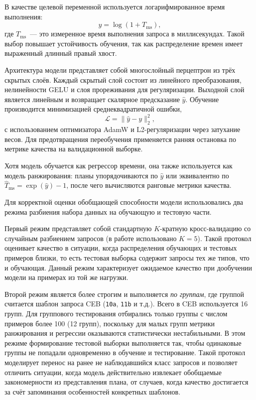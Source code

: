 В качестве целевой переменной используется логарифмированное время выполнения:
\begin{equation}
y = \log(1 + T_{\mathrm{ms}}),
\end{equation}
где \(T_{\mathrm{ms}}\)~--- это измеренное время выполнения запроса в миллисекундах. Такой выбор повышает устойчивость обучения, так как распределение времен имеет выраженный длинный правый хвост.

Архитектура модели представляет собой многослойный перцептрон из трёх скрытых слоёв. Каждый скрытый слой состоит из линейного преобразования, нелинейности GELU и слоя прореживания для регуляризации. Выходной слой является линейным и возвращает скалярное предсказание \(\hat{y}\). Обучение производится минимизацией среднеквадратичной ошибки,
\begin{equation}
\mathcal{L} = \lVert \hat{y} - y \rVert_2^2,
\end{equation}
с использованием оптимизатора AdamW и L2-регуляризации через затухание весов. Для предотвращения переобучения применяется ранняя остановка по метрике качества на валидационной выборке.

Хотя модель обучается как регрессор времени, она также используется как модель ранжирования: планы упорядочиваются по \(\hat{y}\) или эквивалентно по \(\widehat{T}_{\mathrm{ms}}=\exp(\hat{y})-1\), после чего вычисляются ранговые метрики качества.

Для корректной оценки обобщающей способности модели использовались два режима разбиения набора данных на обучающую и тестовую части.

Первый режим представляет собой стандартную \(K\)-кратную кросс-валидацию со случайным разбиением запросов (в работе использовано \(K=5\)). Такой протокол оценивает качество в ситуации, когда распределения обучающих и тестовых примеров близки, то есть тестовая выборка содержит запросы тех же типов, что и обучающая. Данный режим характеризует ожидаемое качество при дообучении модели на примерах из той же нагрузки.

Второй режим является более строгим и выполняется \emph{по группам}, где группой считается шаблон запроса CEB (\texttt{10a}, \texttt{11b} и т.д.). Всего в CEB используется 16 групп. Для группового тестирования отбирались только группы с числом примеров более 100 (12 групп), поскольку для малых групп метрики ранжирования и регрессии оказываются статистически нестабильными. В этом режиме формирование тестовой выборки выполняется так, чтобы одинаковые группы не попадали одновременно в обучение и тестирование. Такой протокол моделирует перенос на ранее не наблюдавшийся класс запросов и позволяет отличить ситуации, когда модель действительно извлекает обобщаемые закономерности из представления плана, от случаев, когда качество достигается за счёт запоминания особенностей конкретных шаблонов.


